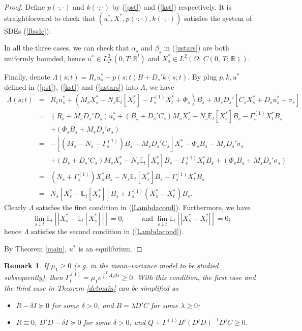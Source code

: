 \documentclass[final]{siamltex}
\newtheorem{remark}[theorem]{Remark}
\begin{document}
\begin{proof}
Define $p(\cdot;\cdot)$ and $ k(\cdot;\cdot)$
by (\ref{pst}) and (\ref{kst}) respectively. It is straightforward  to check that $(u^*_\cdot, X^*_\cdot, p(\cdot;\cdot), k(\cdot;\cdot))$ satisfies the system of SDEs (\ref{fbsde}).

In all the three cases,  we can  check that
$\alpha_s$ and $\beta_s$ in (\ref{ustars}) are both uniformly bounded, hence $u^*\in L_{{\mathcal F}}^2(0,T; {\mathbb{R}}^l)$
and $X^*_s\in L^2(\Omega;\, C(0,\, T; \, {\mathbb{R}}))$.

Finally, denote $\Lambda(s;t)=R_su^*_s+p(s;t)B+D_s'k(s;t)$. By plug $p, k, u^*$ defined in (\ref{pst}), (\ref{kst}) and (\ref{ustars}) into $\Lambda$,  we have
\begin{eqnarray*}
\Lambda(s;t)
&=&R_su^*_s+(M_sX^*_s -N_s\mathbb E_t[X^*_s] -\Gamma^{(1)}_s X_t^*+\Phi_s)B_s
+M_sD_s'[C_sX^*_s+D_su^*_s+\sigma_s]\\
&=&(R_s+M_sD_s'D_s)u^*_s+(B_s+D_s'C_s)M_sX^*_s
       -N_s{\mathbb{E}_t\left[{X^*_s}\right]}B_s-\Gamma^{(1)}_sX^*_tB_s\\
       &&+(\Phi_sB_s+M_sD_s'\sigma_s)\\
 &=&-[(M_s-N_s-\Gamma^{(1)}_s)B_s+M_sD_s'C_s]X^*_s-\Phi_sB_s-M_sD_s'\sigma_s\\
&&+(B_s+D_s'C_s)M_sX^*_s-N_s{\mathbb{E}_t\left[{X^*_s}\right]}B_s-\Gamma^{(1)}_sX^*_tB_s+(\Phi_sB_s+M_sD_s'\sigma_s)\\
 &=&(N_s+\Gamma^{(1)}_s)X^*_sB_s-N_s{\mathbb{E}_t\left[{X^*_s}\right]}B_s-\Gamma^{(1)}_sX^*_tB_s\\
&=&N_s[X^*_s-{\mathbb{E}_t\left[{X^*_s}\right]}]B_s+\Gamma^{(1)}_s(X^*_s-X^*_t)B_s.
\end{eqnarray*}
Clearly $\Lambda$ satisfies the first condition in (\ref{Lambdacond}). Furthermore,
we have
 $$\lim_{s\downarrow t} {\mathbb{E}_t\left[{|X^*_s-{\mathbb{E}_t\left[{X^*_s}\right]}|}\right]}=0,\qquad \mbox{ and }
 \lim_{s\downarrow t} {\mathbb{E}_t\left[{|X^*_s-X^*_t|}\right]}=0;$$
  hence $\Lambda$ satisfies the second condition in (\ref{Lambdacond}).

By Theorem \ref{main}, $u^*$ is an equilibrium.
\end{proof}

\begin{remark}
{\rm If  $\mu_1\ge 0$ (e.g. in the mean--variance model to be studied subsequently), then  $\Gamma^{(1)}_t=\mu_1 e^{\int_t^TA_sds}\ge 0$.
With this condition, the first case and the third case in Theorem \ref{detmain} can be simplified as
\begin{itemize}
\item [(i')]$R-\delta I\succeq 0$ for some $\delta>0$, and $B=\lambda D'C$ for some $\lambda\ge 0$;
\item [(iii')] $R\equiv 0$, $D'D-\delta I\succeq 0$ for some $\delta>0$, and $ Q+\Gamma^{(1)} B'(D'D)^{-1}D'C\ge 0$.
\end{itemize}}

\end{remark}
\end{document}
